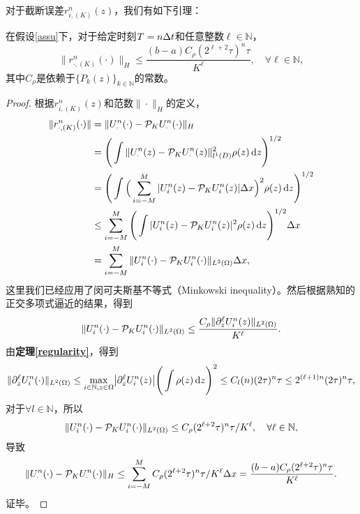 对于截断误差$r^n_{i,(K)}(z)$，我们有如下引理：
\begin{lem}\label{hy_tr_e}
  在假设\ref{assu}下，对于给定时刻$T = n\Delta t$和任意整数$\ell\in\mathbb{N}$，
  \begin{equation}
    \|r^n_{\cdot,(K)}(\cdot)\|_H \leq \frac{(b-a)C_\rho (2^{\ell+2}\tau)^n\tau}{K^\ell}, \quad\forall\ell\in\mathbb{N},
  \end{equation}
  其中$C_\rho$是依赖于$\{P_k(z)\}_{k\in\mathbb{N}}$的常数。
\end{lem}
\begin{proof}
  根据$r^n_{i,(K)}(z)$和范数$\|\cdot\|_H$的定义，
  \begin{equation}
    \begin{split}
      \|r^n_{\cdot,(K)}(\cdot)\| 
      & = \|U^n_\cdot(\cdot) - \mathcal{P}_K U^n_\cdot(\cdot)\|_H 
      \\
      & = \Bigg(\int\|U^n_\cdot(z) - \mathcal{P}_K U^n_\cdot(z)\|^2_{l^1(D)}\rho(z)\mathop{}\!\mathrm{d} z\Bigg)^{1/2}
      \\
      & = \Bigg(\int\Big(\sum\limits_{i=-M}^M |U^n_i(z) - \mathcal{P}_K U^n_i(z)|\Delta x\Big)^2\rho(z)\mathop{}\!\mathrm{d} z\Bigg)^{1/2}
      \\
      & \leq \sum\limits_{i=-M}^M \Bigg(\int |U^n_i(z) - \mathcal{P}_K U^n_i(z)|^2\rho(z)\mathop{}\!\mathrm{d} z\Bigg)^{1/2}\Delta x
      \\
      & = \sum_{i=-M}^M \|U^n_i(\cdot) - \mathcal{P}_K U^n_i(\cdot)\|_{L^2(\Omega)}\Delta x,
    \end{split}
  \end{equation}
  这里我们已经应用了闵可夫斯基不等式（Minkowski inequality）。然后根据熟知的正交多项式逼近的结果，得到
  \begin{equation}
    \|U^n_i(\cdot) - \mathcal{P}_K U^n_i(\cdot)\|_{L^2(\Omega)}\leq \frac{C_\rho\|\partial^{\ell}_zU^n_i(z)\|_{L^2(\Omega)}}{K^\ell}.
  \end{equation}
  由{\bf 定理\ref{regularity}}，得到
  \begin{equation}
    \|\partial^{\ell}_zU^n_i(\cdot)\|_{L^2(\Omega)} \leq \underset{i\in\mathbb{N}, z\in\Omega}{\max}\big|\partial^{\ell}_zU^n_i(z)\big| \Bigg(\int \rho(z)\mathop{}\!\mathrm{d} z\Bigg)^2 \leq C_l(n)(2\tau)^n\tau \leq 2^{(\ell+1)n}(2\tau)^n\tau,
  \end{equation}
  对于$\forall l\in\mathbb{N}$，所以
  \begin{equation}\label{err2}
    \|U^n_i(\cdot) - \mathcal{P}_K U^n_i(\cdot)\|_{L^2(\Omega)}\leq C_\rho (2^{\ell+2}\tau)^n\tau/K^\ell, \quad\forall\ell\in\mathbb{N},
  \end{equation}
  导致
  \begin{equation}
      \|U^n_\cdot(\cdot) - \mathcal{P}_K U^n_\cdot(\cdot)\|_H \leq \sum_{i=-M}^M C_\rho (2^{\ell+2}\tau)^n\tau/K^\ell\Delta x = \frac{(b-a)C_\rho (2^{\ell+2}\tau)^n\tau}{K^\ell}.
  \end{equation}
  证毕。
\end{proof}

